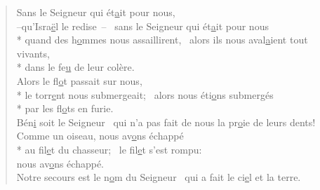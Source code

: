 
\begin{verse}
Sans le Seigneur qui ét\underline{a}it pour nous, \\
–qu’Isra\underline{ë}l le redise – \psalmdagger
{}sans le Seigneur qui ét\underline{a}it pour nous \\*
quand des h\underline{o}mmes nous assaillirent,~\psalmstar
{}alors ils nous aval\underline{a}ient tout vivants, \\*
dans le fe\underline{u} de leur colère. \\

Alors le fl\underline{o}t passait sur nous, \\*
le torr\underline{e}nt nous submergeait;~\psalmstar
{}alors nous éti\underline{o}ns submergés \\*
par les fl\underline{o}ts en furie. \\

Bén\underline{i} soit le Seigneur~\psalmstar
qui n’a pas fait de nous
la pr\underline{o}ie de leurs dents! \\

Comme un oiseau, nous av\underline{o}ns échappé \\*
au fil\underline{e}t du chasseur;~\psalmstar
le fil\underline{e}t s’est rompu: \\
nous av\underline{o}ns échappé. \\

Notre secours est le n\underline{o}m du Seigneur~\psalmstar
qui a fait le ci\underline{e}l et la terre. \\
\end{verse}

